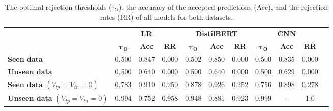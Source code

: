 \begin{table}
    \scriptsize
    \centering
    \setlength\tabcolsep{5pt}
    \begin{tabular}{lcccccccccc}
        \toprule
                                                 & \multicolumn{3}{c}{\textbf{LR}} & \multicolumn{3}{c}{\textbf{DistilBERT}} & \multicolumn{3}{c}{\textbf{CNN}}                                                                                                           \\
        \cmidrule(l){2-4} \cmidrule(l){5-7} \cmidrule(l){8-10}
                                                 & $\boldsymbol{\tau_O}$           & \textbf{Acc}                            & \textbf{RR}                      & $\boldsymbol{\tau_O}$ & \textbf{Acc} & \textbf{RR} & $\boldsymbol{\tau_O}$ & \textbf{Acc} & \textbf{RR} \\
        \midrule
        \textbf{Seen data}                       & 0.500                           & 0.847                                   & 0.000                            & 0.502                 & 0.850        & 0.000       & 0.500                 & 0.835        & 0.000       \\
        \textbf{Unseen data}                     & 0.500                           & 0.640                                   & 0.000                            & 0.500                 & 0.640        & 0.000       & 0.500                 & 0.629        & 0.000       \\
        \midrule
        \textbf{Seen data $(V_{tp}=V_{tn}=0)$}   & 0.783                           & 0.910                                   & 0.250                            & 0.878                 & 0.926        & 0.252       & 0.756                 & 0.898        & 0.278       \\
        \textbf{Unseen data $(V_{tp}=V_{tn}=0)$} & 0.994                           & 0.752                                   & 0.958                            & 0.948                 & 0.881        & 0.923       & 0.999                 & -            & 1.0         \\
        \bottomrule
    \end{tabular}
    \caption{The optimal rejection thresholds ($\tau_O$), the accuracy of the accepted predictions (Acc), and the rejection rates (RR) of all models for both datasets.}
    \label{tab:metric}
\end{table}

